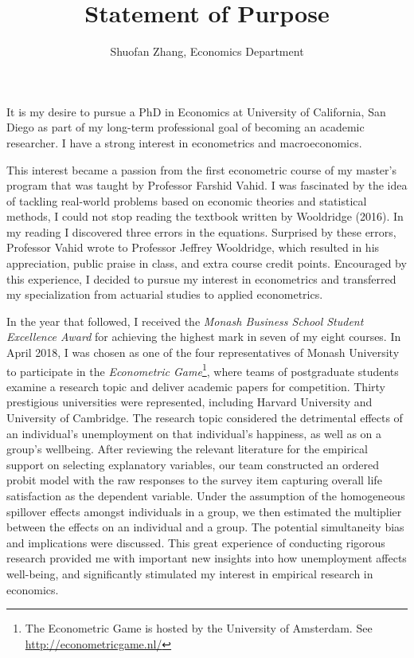 \documentclass[12pt,]{article}
\title{Statement of Purpose}
\author{Shuofan Zhang, Economics Department}
\date{}
\let\rmarkdownfootnote\footnote%
\def\footnote{\protect\rmarkdownfootnote}
\begin{document}
\maketitle


It is my desire to pursue a PhD in Economics at University of
California, San Diego as part of my long-term professional goal of
becoming an academic researcher. I have a strong interest in
econometrics and macroeconomics.

This interest became a passion from the first econometric course of my
master's program that was taught by Professor Farshid Vahid. I was
fascinated by the idea of tackling real-world problems based on economic
theories and statistical methods, I could not stop reading the textbook
written by Wooldridge (2016). In my reading I discovered three errors in
the equations. Surprised by these errors, Professor Vahid wrote to
Professor Jeffrey Wooldridge, which resulted in his appreciation, public
praise in class, and extra course credit points. Encouraged by this
experience, I decided to pursue my interest in econometrics and
transferred my specialization from actuarial studies to applied
econometrics.

In the year that followed, I received the \emph{Monash Business School
Student Excellence Award} for achieving the highest mark in seven of my
eight courses. In April 2018, I was chosen as one of the four
representatives of Monash University to participate in the
\emph{Econometric Game}\footnote{The Econometric Game is hosted by the
  University of Amsterdam. See \url{http://econometricgame.nl/}}, where
teams of postgraduate students examine a research topic and deliver
academic papers for competition. Thirty prestigious universities were
represented, including Harvard University and University of Cambridge.
The research topic considered the detrimental effects of an individual's
unemployment on that individual's happiness, as well as on a group's
wellbeing. After reviewing the relevant literature for the empirical
support on selecting explanatory variables, our team constructed an
ordered probit model with the raw responses to the survey item capturing
overall life satisfaction as the dependent variable. Under the
assumption of the homogeneous spillover effects amongst individuals in a
group, we then estimated the multiplier between the effects on an
individual and a group. The potential simultaneity bias and implications
were discussed. This great experience of conducting rigorous research
provided me with important new insights into how unemployment affects
well-being, and significantly stimulated my interest in empirical
research in economics.
\end{document}
